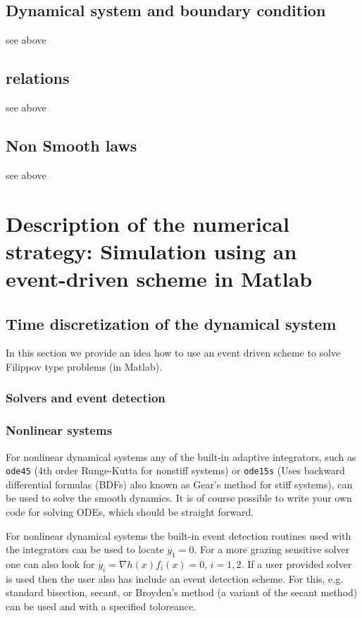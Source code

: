 \documentclass[10pt]{article}
\begin{document}
\subsection{Dynamical system and boundary condition}
see above
\subsection{relations}
see above
\subsection{Non Smooth laws}
see above

\section{Description of the numerical strategy: Simulation using an event-driven scheme in Matlab}
\label{Sec:Simulation}

\subsection{Time discretization of the dynamical system}

In this section we provide an idea how to use an event driven scheme to solve Filippov type problems (in Matlab).
\subsubsection{Solvers and event detection} \label{sec:solvers}
\subsubsection*{Nonlinear systems}
For nonlinear dynamical systems any of the built-in adaptive integrators, such as \verb|ode45| (4th order Runge-Kutta for nonstiff systems) or \verb|ode15s| (Uses backward differential formulas (BDFs) also known as Gear's method for stiff systems), can be used to solve the smooth dynamics. It is of course possible to write your own code for solving ODEs, which should be straight forward. 

For nonlinear dynamical systems the built-in event detection routines used with the integrators can be used to locate $y_1=0$. For a more grazing sensitive solver one can also look for $\dot{y_i} = \nabla h(x)f_i(x)=0$, $i=1,2$. If a user provided solver is used then the user also has include an event detection scheme. For this, e.g. standard bisection, secant, or Broyden's method (a variant of the secant method) can be used and with a specified toloreance.
   
\end{document}
